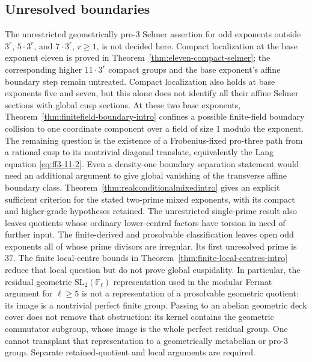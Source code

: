 \documentclass[11pt]{article}
\newcommand{\F}{\mathbb F}
\numberwithin{equation}{section}
\theoremstyle{definition}
\begin{document}
\subsection{Unresolved boundaries}
The unrestricted geometrically pro-$3$ Selmer assertion for odd
exponents outside $3^r$, $5\cdot3^r$, and $7\cdot3^r$, $r\ge1$, is not decided here.
Compact localization at the base exponent eleven is proved in
Theorem~\ref{thm:eleven-compact-selmer}; the corresponding higher
$11\cdot3^r$ compact groups and the base exponent's affine boundary
step remain untreated. Compact localization also holds at base
exponents five and seven, but this alone does not identify all their
affine Selmer sections with global cusp sections. At these two base
exponents, Theorem~\ref{thm:finitefield-boundary-intro} confines a
possible finite-field boundary collision to one coordinate component
over a field of size \(1\) modulo the exponent. The remaining question
is the existence of a Frobenius-fixed pro-three path from a rational
cusp to its nontrivial diagonal translate, equivalently the Lang
equation \eqref{eq:ff3-11-2}. Even a density-one boundary separation
statement would need an additional argument to give global vanishing
of the transverse affine boundary class.
Theorem~\ref{thm:realconditionalmixedintro} gives an explicit sufficient
criterion for the stated two-prime mixed exponents, with its compact
and higher-grade hypotheses retained. The
unrestricted single-prime result also leaves quotients whose ordinary
lower-central factors have torsion in need of further input. The
finite-derived and prosolvable classification leaves open odd
exponents all of whose prime divisors are irregular. Its first
unresolved prime is \(37\). The finite local-centre bounds in
Theorem~\ref{thm:finite-local-centres-intro} reduce that local
question but do not prove global cuspidality. In particular, the residual geometric
$\mathrm{SL}_2(\F_\ell)$ representation used in the modular Fermat
argument for $\ell\geq5$ is not a representation of a prosolvable
geometric quotient: its image is a nontrivial perfect finite group.
Passing to an abelian geometric deck cover does not remove that
obstruction: its kernel contains the geometric commutator subgroup,
whose image is the whole perfect residual group. One cannot transplant
that representation to a geometrically metabelian or pro-$3$ group.
Separate retained-quotient and local
arguments are required.










\end{document}
